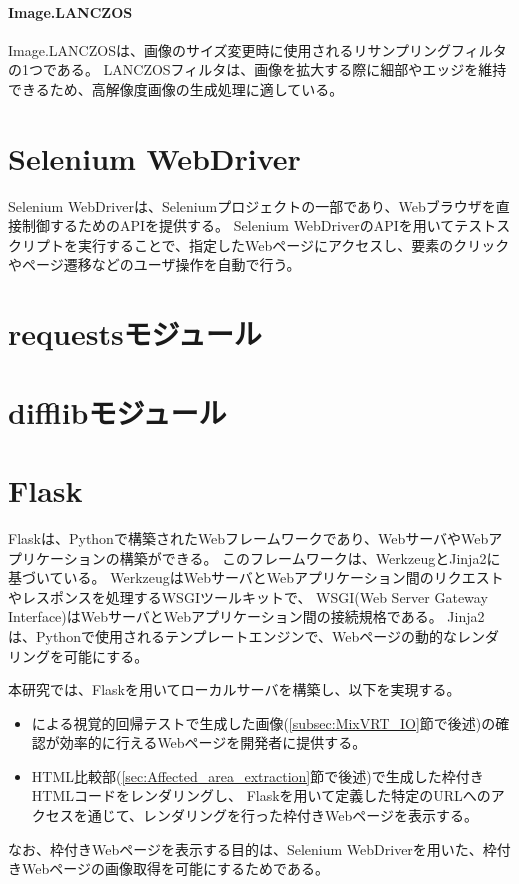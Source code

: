 \paragraph{Image.LANCZOS}
Image.LANCZOSは、画像のサイズ変更時に使用されるリサンプリングフィルタの1つである\cite{LANCZOS}。
LANCZOSフィルタは、画像を拡大する際に細部やエッジを維持できるため、高解像度画像の生成処理に適している。

\section{Selenium WebDriver}\label{sec:Selenium_WebDriver}
Selenium WebDriver\cite{Selenium WebDriver}は、Seleniumプロジェクト\cite{Selenium}の一部であり、Webブラウザを直接制御するためのAPIを提供する。
Selenium WebDriverのAPIを用いてテストスクリプトを実行することで、指定したWebページにアクセスし、要素のクリックやページ遷移などのユーザ操作を自動で行う。

\section{requestsモジュール}\label{sec:requests}

\section{difflibモジュール}\label{sec:difflib}

\section{Flask}\label{sec:Flask}
Flask\cite{Flask}は、Pythonで構築されたWebフレームワークであり、WebサーバやWebアプリケーションの構築ができる。
このフレームワークは、Werkzeug\cite{Werkzeug}とJinja2\cite{Jinja}に基づいている。
WerkzeugはWebサーバとWebアプリケーション間のリクエストやレスポンスを処理するWSGIツールキットで、
WSGI(Web Server Gateway Interface)\cite{WSGI}はWebサーバとWebアプリケーション間の接続規格である。
Jinja2は、Pythonで使用されるテンプレートエンジンで、Webページの動的なレンダリングを可能にする。
\par
本研究では、Flaskを用いてローカルサーバを構築し、以下を実現する。
\begin{itemize}
      \setlength{\itemsep}{0pt}
            \setlength{\parsep}{0pt}
      \item \toolName による視覚的回帰テストで生成した画像(\ref{subsec:MixVRT_IO}節で後述)の確認が効率的に行えるWebページを開発者に提供する。
      \item HTML比較部(\ref{sec:Affected_area_extraction}節で後述)で生成した枠付きHTMLコードをレンダリングし、
            Flaskを用いて定義した特定のURLへのアクセスを通じて、レンダリングを行った枠付きWebページを表示する。
\end{itemize}
なお、枠付きWebページを表示する目的は、Selenium WebDriverを用いた、枠付きWebページの画像取得を可能にするためである。

